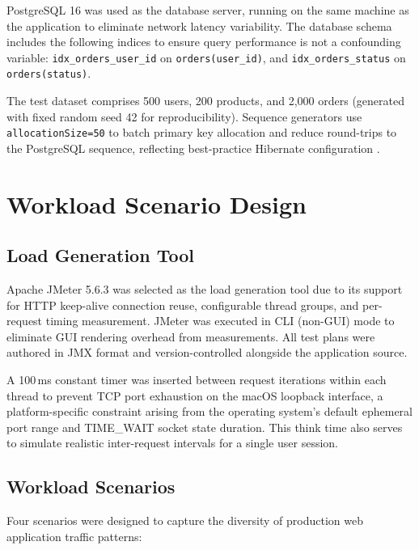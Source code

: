 PostgreSQL 16 was used as the database server, running on the same machine as the application to eliminate network latency variability. The database schema includes the following indices to ensure query performance is not a confounding variable: \texttt{idx\_orders\_user\_id} on \texttt{orders(user\_id)}, and \texttt{idx\_orders\_status} on \texttt{orders(status)}.

The test dataset comprises 500 users, 200 products, and 2,000 orders (generated with fixed random seed 42 for reproducibility). Sequence generators use \texttt{allocationSize=50} to batch primary key allocation and reduce round-trips to the PostgreSQL sequence, reflecting best-practice Hibernate configuration \cite{hibernate2024}.

\section{Workload Scenario Design}
\label{sec:workload-design}

\subsection{Load Generation Tool}
\label{subsec:jmeter}

Apache JMeter 5.6.3 \cite{jmeter2024} was selected as the load generation tool due to its support for HTTP keep-alive connection reuse, configurable thread groups, and per-request timing measurement. JMeter was executed in CLI (non-GUI) mode to eliminate GUI rendering overhead from measurements. All test plans were authored in JMX format and version-controlled alongside the application source.

A 100\,ms constant timer was inserted between request iterations within each thread to prevent TCP port exhaustion on the macOS loopback interface, a platform-specific constraint arising from the operating system's default ephemeral port range and TIME\_WAIT socket state duration. This think time also serves to simulate realistic inter-request intervals for a single user session.

\subsection{Workload Scenarios}
\label{subsec:scenarios}

Four scenarios were designed to capture the diversity of production web application traffic patterns:

